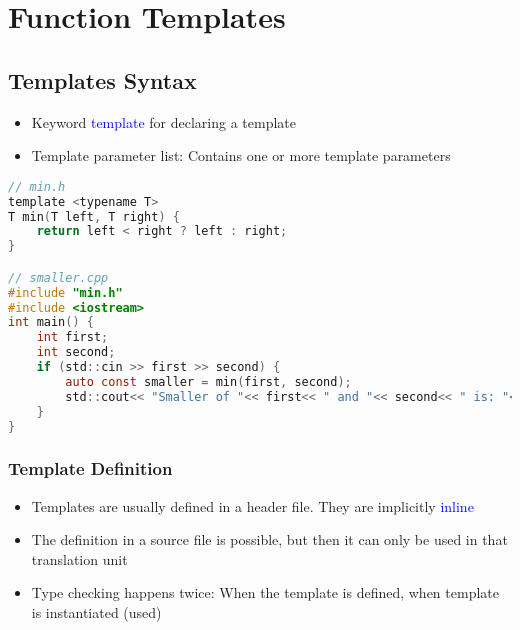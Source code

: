 
\section{Function Templates}

\subsection{Templates Syntax}
\begin{itemize}
    \item Keyword \textcolor{blue}{template} for declaring a template
    \item Template parameter list: Contains one or more template parameters
\end{itemize}

\begin{lstlisting}[style=frame, style= linenumbers, language=C]
// min.h
template <typename T>
T min(T left, T right) {
    return left < right ? left : right;
}

// smaller.cpp
#include "min.h"
#include <iostream>
int main() {
    int first;
    int second;
    if (std::cin >> first >> second) {
        auto const smaller = min(first, second);
        std::cout<< "Smaller of "<< first<< " and "<< second<< " is: "<< smaller<< '\n';
    }
}
\end{lstlisting}

\subsubsection{Template Definition}
\begin{itemize}
    \item Templates are usually defined in a header file. They are implicitly \textcolor{blue}{inline}
    \item The definition in a source file is possible, but then it can only be used in that translation unit
    \item Type checking happens twice: When the template is defined, when template is instantiated (used)
\end{itemize}

